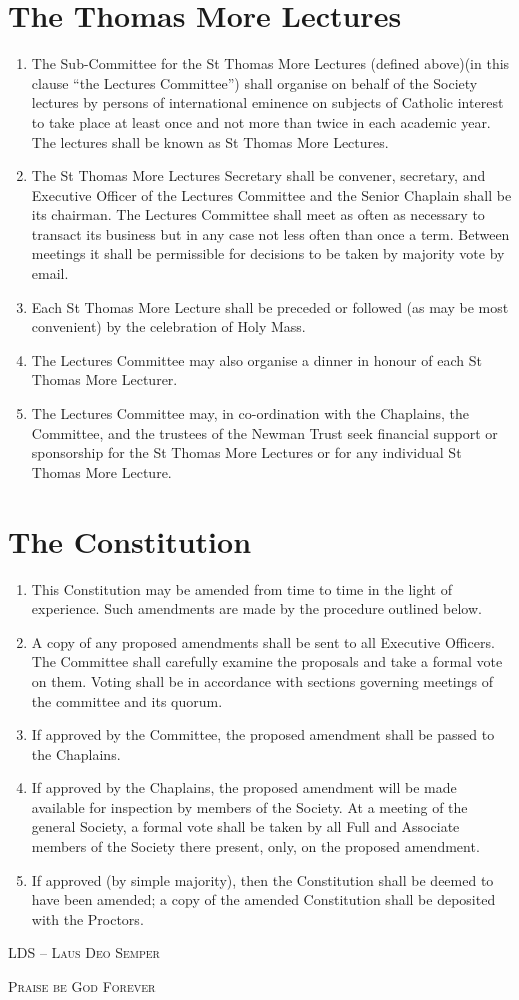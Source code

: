 \documentclass[11pt]{article}
\begin{document}
\section{The Thomas More Lectures}
\begin{enumerate}
\item The Sub-Committee for the St Thomas More Lectures (defined above)(in this clause ``the Lectures Committee'') shall organise on behalf of the Society lectures by persons of international eminence on subjects of Catholic interest to take place at least once and not more than twice in each academic year. The lectures shall be known as St Thomas More Lectures.
\item The St Thomas More Lectures Secretary shall be convener, secretary, and Executive Officer of the Lectures Committee and the Senior Chaplain shall be its chairman. The Lectures Committee shall meet as often as necessary to transact its business but in any case not less often than once a term. Between meetings it shall be permissible for decisions to be taken by majority vote by email.
\item Each St Thomas More Lecture shall be preceded or followed (as may be most convenient) by the celebration of Holy Mass. 
\item The Lectures Committee may also organise a dinner in honour of each St Thomas More Lecturer.
\item The Lectures Committee may, in co-ordination with the Chaplains, the Committee, and the trustees of the Newman Trust seek financial support or sponsorship for the St Thomas More Lectures or for any individual St Thomas More Lecture.
\end{enumerate}
\section{The Constitution}
\begin{enumerate}
\item This Constitution may be amended from time to time in the light of experience. Such amendments are made by the procedure outlined below.
\item A copy of any proposed amendments shall be sent to all Executive Officers. The Committee shall carefully examine the proposals and take a formal vote on them. Voting shall be in accordance with sections governing meetings of the committee and its quorum.
\item If approved by the Committee, the proposed amendment shall be passed to the Chaplains.
\item If approved by the Chaplains, the proposed amendment will be made available for inspection by members of the Society. At a meeting of the general Society, a formal vote shall be taken by all Full and Associate members of the Society there present, only, on the proposed amendment.
\item If approved (by simple majority), then the Constitution shall be deemed to have been amended; a copy of the amended Constitution shall be deposited with the Proctors.
\end{enumerate}

\centerline{\scshape{LDS -- Laus Deo Semper}}

\centerline{\scshape{Praise be God Forever}}
\end{document}
